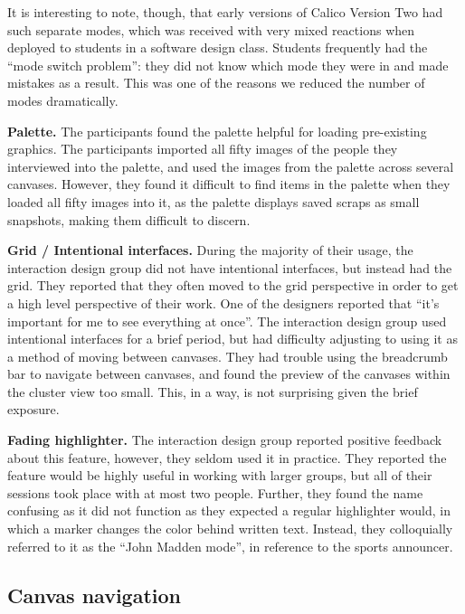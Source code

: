 \documentclass[12pt,fleqn]{ucithesis}
\begin{document}
It is interesting to note, though, that early versions of Calico Version Two had such separate modes, which was received with very mixed reactions when deployed to students in a software design class. Students frequently had the ``mode switch problem'': they did not know which mode they were in and made mistakes as a result. This was one of the reasons we reduced the number of modes dramatically.

\textbf{Palette.} The participants found the palette helpful for loading pre-existing graphics. The participants imported all fifty images of the people they interviewed into the palette, and used the images from the palette across several canvases. However, they found it difficult to find items in the palette when they loaded all fifty images into it, as the palette displays saved scraps as small snapshots, making them difficult to discern.

\textbf{Grid / Intentional interfaces.} During the majority of their usage, the interaction design group did not have intentional interfaces, but instead had the grid. They reported that they often moved to the grid perspective in order to get a high level perspective of their work. One of the designers reported that ``it's important for me to see everything at once''. The interaction design group used intentional interfaces for a brief period, but had difficulty adjusting to using it as a method of moving between canvases. They had trouble using the breadcrumb bar to navigate between canvases, and found the preview of the canvases within the cluster view too small. This, in a way, is not surprising given the brief exposure.

\textbf{Fading highlighter.} The interaction design group reported positive feedback about this feature, however, they seldom used it in practice. They reported the feature would be highly useful in working with larger groups, but all of their sessions took place with at most two people. Further, they found the name confusing as it did not function as they expected a regular highlighter would, in which a marker changes the color behind written text. Instead, they colloquially referred to it as the ``John Madden mode'', in reference to the sports announcer.

\subsection{Canvas navigation}
\end{document}
